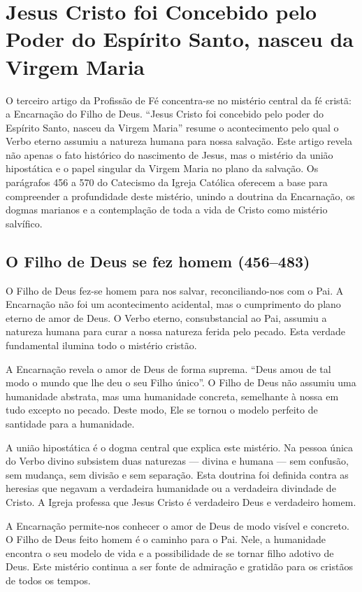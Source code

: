 \chapter{Jesus Cristo foi Concebido pelo Poder do Espírito Santo, nasceu da Virgem Maria}

O terceiro artigo da Profissão de Fé concentra-se no mistério central da fé cristã: a Encarnação do Filho de Deus. ``Jesus Cristo foi concebido pelo poder do Espírito Santo, nasceu da Virgem Maria'' resume o acontecimento pelo qual o Verbo eterno assumiu a natureza humana para nossa salvação. Este artigo revela não apenas o fato histórico do nascimento de Jesus, mas o mistério da união hipostática e o papel singular da Virgem Maria no plano da salvação. Os parágrafos 456 a 570 do Catecismo da Igreja Católica oferecem a base para compreender a profundidade deste mistério, unindo a doutrina da Encarnação, os dogmas marianos e a contemplação de toda a vida de Cristo como mistério salvífico.

\section{O Filho de Deus se fez homem (456--483)}

O Filho de Deus fez-se homem para nos salvar, reconciliando-nos com o Pai. A Encarnação não foi um acontecimento acidental, mas o cumprimento do plano eterno de amor de Deus. O Verbo eterno, consubstancial ao Pai, assumiu a natureza humana para curar a nossa natureza ferida pelo pecado. Esta verdade fundamental ilumina todo o mistério cristão.

A Encarnação revela o amor de Deus de forma suprema. ``Deus amou de tal modo o mundo que lhe deu o seu Filho único''. O Filho de Deus não assumiu uma humanidade abstrata, mas uma humanidade concreta, semelhante à nossa em tudo excepto no pecado. Deste modo, Ele se tornou o modelo perfeito de santidade para a humanidade.

A união hipostática é o dogma central que explica este mistério. Na pessoa única do Verbo divino subsistem duas naturezas --- divina e humana --- sem confusão, sem mudança, sem divisão e sem separação. Esta doutrina foi definida contra as heresias que negavam a verdadeira humanidade ou a verdadeira divindade de Cristo. A Igreja professa que Jesus Cristo é verdadeiro Deus e verdadeiro homem.

A Encarnação permite-nos conhecer o amor de Deus de modo visível e concreto. O Filho de Deus feito homem é o caminho para o Pai. Nele, a humanidade encontra o seu modelo de vida e a possibilidade de se tornar filho adotivo de Deus. Este mistério continua a ser fonte de admiração e gratidão para os cristãos de todos os tempos.


